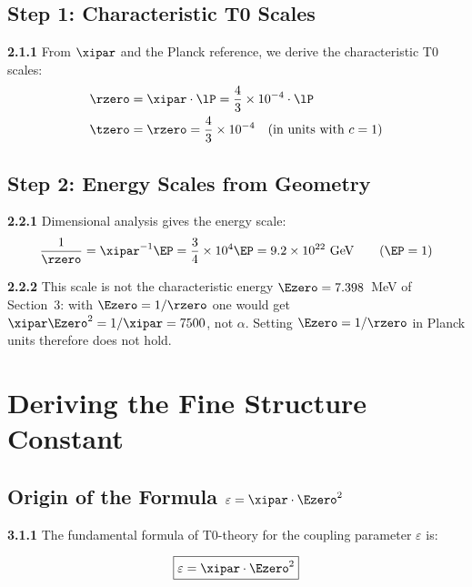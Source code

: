 	\subsection{Step 1: Characteristic T0 Scales}
	
	\noindent \textbf{2.1.1} From $\xipar$ and the Planck reference, we derive the characteristic T0 scales:
	\begin{align}
		\rzero &= \xipar \cdot \lP = \frac{4}{3} \times 10^{-4} \cdot \lP \\
		\tzero &= \rzero = \frac{4}{3} \times 10^{-4} \quad \text{(in units with } c=1\text{)}
	\end{align}
	
	\subsection{Step 2: Energy Scales from Geometry}
	
	\noindent \textbf{2.2.1} Dimensional analysis gives the energy scale:
	\begin{equation}
		\frac{1}{\rzero} = \xipar^{-1} \EP = \frac{3}{4} \times 10^{4} \EP = 9.2\times10^{22}~\text{GeV} \qquad (\EP = 1)
	\end{equation}
	
	\noindent \textbf{2.2.2} This scale is not the characteristic energy $\Ezero = 7.398$~MeV of Section~3: with $\Ezero = 1/\rzero$ one would get $\xipar\Ezero^2 = 1/\xipar = 7500$, not $\alpha$. Setting $\Ezero = 1/\rzero$ in Planck units therefore does not hold.
	
	\section{Deriving the Fine Structure Constant}
	
	\subsection{Origin of the Formula $\varepsilon = \xipar \cdot \Ezero^2$}
	
	\noindent \textbf{3.1.1} The fundamental formula of T0-theory for the coupling parameter $\varepsilon$ is:
	\begin{keyresult}
		\begin{equation}
			\boxed{\varepsilon = \xipar \cdot \Ezero^2}
			\label{eq:epsilon_definition}
		\end{equation}
	\end{keyresult}
	
